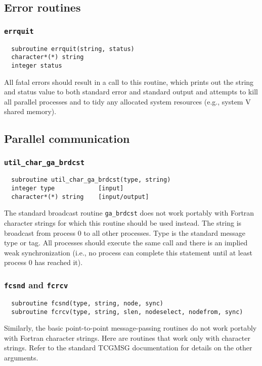 \subsection{Error routines}

\subsubsection{{\tt errquit}}
\label{errquit}
\begin{verbatim}
  subroutine errquit(string, status)
  character*(*) string
  integer status
\end{verbatim}
All fatal errors should result in a call to this routine, which prints
out the string and status value to both standard error and standard
output and attempts to kill all parallel processes and to tidy any
allocated system resources (e.g., system V shared memory).

\subsection{Parallel communication}

\subsubsection{{\tt util\_char\_ga\_brdcst}}
\begin{verbatim}
  subroutine util_char_ga_brdcst(type, string)
  integer type            [input]
  character*(*) string    [input/output]
\end{verbatim}
The standard broadcast routine {\tt ga\_brdcst} does not work portably
with Fortran character strings for which this routine should be used
instead.  The string is broadcast from process 0 to all other
processes.  Type is the standard message type or tag. All processes
should execute the same call and there is an implied weak
synchronization (i.e., no process can complete this statement until at
least process 0 has reached it).

\subsubsection{{\tt fcsnd} and {\tt fcrcv}}
\begin{verbatim}
  subroutine fcsnd(type, string, node, sync)
  subroutine fcrcv(type, string, slen, nodeselect, nodefrom, sync)
\end{verbatim}
Similarly, the basic point-to-point message-passing routines do not
work portably with Fortran character strings.  Here are routines that
work only with character strings.  Refer to the standard TCGMSG
documentation for details on the other arguments.


